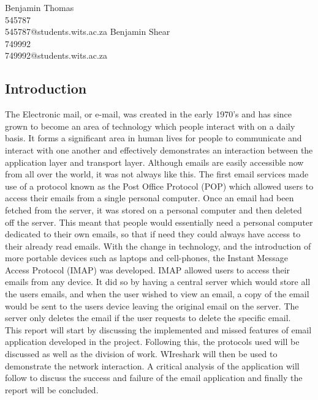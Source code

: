 \documentclass[11pt]{article}
\begin{document}
\begin{center}
{\Huge Benjamin Thomas} \\
{\Large 545787} \\
{\large 545787@students.wits.ac.za}
\break{}
\break{}
{\Huge Benjamin Shear} \\
{\Large 749992} \\
{\large 749992@students.wits.ac.za}
\end{center}
\vspace{5cm}
\begin{abstract}
\justify
    
\end{abstract}
\newpage
\begin{multicols}{2}
\section{Introduction}
The Electronic mail, or e-mail, was created in the early 1970's and has since grown to become an area of technology which people interact with on a daily basis. It forms a significant area in human lives for people to communicate and interact with one another and effectively demonstrates an interaction between the application layer and transport layer. Although emails are easily accessible now from all over the world, it was not always like this. The first email services made use of a protocol known as the Post Office Protocol (POP) which allowed users to access their emails from a single personal computer. Once an email had been fetched from the server, it was stored on a personal computer and then deleted off the server. This meant that people would essentially need a personal computer dedicated to their own emails, so that if need they could always have access to their already read emails. With the change in technology, and the introduction of more portable devices such as laptops and cell-phones, the Instant Message Access Protocol (IMAP) was developed. IMAP allowed users to access their emails from any device. It did so by having a central server which would store all the users emails, and when the user wished to view an email, a copy of the email would be sent to the users device leaving the original email on the server. The server only deletes the email if the user requests to delete the specific email.\\
This report will start by discussing the implemented and missed features of email application developed in the project. Following this, the protocols used will be discussed as well as the division of work. WIreshark will then be used to demonstrate the network interaction. A critical analysis of the application will follow to discuss the success and failure of the email application and finally the report will be concluded. 

\end{multicols}
\end{document}
